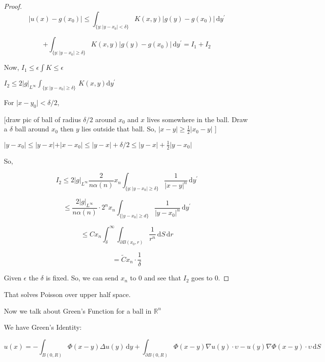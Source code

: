 \documentclass{article}
\theoremstyle{definition}
\begin{document}
\begin{proof}
    \[
        \vert u(x) - g(x_0) \vert \leq \int_{\{ y : \vert y - x_0 \vert < \delta \} }^{} K(x,y) \vert g(y) - g(x_0) \vert \,\mathrm{d}y^{\prime}
    \]
        
    \[
        + \int_{\{ y : \vert y - x_0 \vert \geq \delta \} }^{} K(x,y) \vert g(y) - g(x_0) \vert \,\mathrm{d}y^{\prime} = I_1 + I_2 
    \]

    Now, \(I_1 \leq \epsilon \int K \leq \epsilon\) 

    \(I_2 \leq 2 \vert g \vert _{L^{\infty}} \int_{ \{ y : \vert y - x_0 \vert \geq \delta \}} \, K(x,y) \mathrm{d} y^{\prime}  \) 

    For \(\vert x - y_0 \vert < \delta / 2\),

    [draw pic of ball of radius \(\delta / 2\) around \(x_0\) and \(x\) lives somewhere in the ball. Draw a \(\delta\) ball around \(x_0\) then \(y\) lies outside that ball. So, \(\vert x - y \vert \geq \frac{1}{2} \vert x_0 - y \vert \) ]

    \(\vert y - x_0 \vert \leq \vert y - x \vert + \vert x - x_0 \vert \leq \vert y - x \vert + \delta / 2 \leq \vert y - x \vert + \frac{1}{2} \vert y - x_0 \vert \) 

    So,

    \[
        I_2 \leq 2 \vert g \vert _{L^{\infty}} \frac{2}{n \alpha (n)} x_n \int_{\{ y : \vert y - x_0 \vert \geq \delta  \} }^{} \frac{1}{\vert x - y \vert^n} \,\mathrm{d}y^{\prime}
    \] 

    \[
        \leq \frac{2 \vert g \vert _{L^{\infty}}}{n \alpha (n)}\cdot 2^n x_n \int_{\{ \vert y-x_0 \vert \geq d \} }^{} \frac{1}{\vert y - x_0 \vert ^n} \,\mathrm{d}y^{\prime} 
    \]

    \[
        \leq C x_n \int_{\delta}^{\infty} \int_{\partial B(x_0,r)}^{} \frac{1}{r^n} \,\mathrm{d}S  \,\mathrm{d}r 
    \]

    \[
        =\tilde C x_n \cdot \frac{1}{\delta}
    \]

    Given \(\epsilon \) the \(\delta \) is fixed. So, we can send \(x_n\) to \(0\) and see that \(I_2\) goes to \(0\).

\end{proof}

That solves Poisson over upper half space.

Now we talk about Green's Function for a ball in \(\mathbb{R}^n\) 

We have Green's Identity:

\[
    u(x) = -\int_{B(0,R)}^{} \Phi(x-y) \Delta u(y) \,\mathrm{d}y + \int_{\partial B(0,R)}^{} \Phi(x-y)\nabla u(y)\cdot \upsilon - u(y)\nabla\Phi(x-y)\cdot \upsilon \,\mathrm{d}S 
\]
\end{document}
